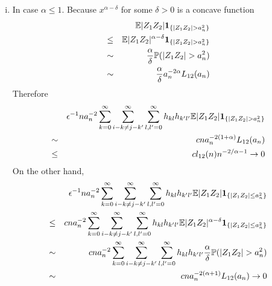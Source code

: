 \documentclass{article}
\begin{document}
\begin{enumerate}[i)]
\item In case $\alpha \leq 1$. 
  Because $x^{\alpha - \delta}$ for some $\delta > 0$ is a concave function
  \begin{eqnarray*}
    && \mathbb{E} |Z_1 Z_2| \mathbf{1}_{\{ |Z_1 Z_2| > a_n^2\}} \\
    &\leq& \mathbb{E} |Z_1 Z_2|^{\alpha-\delta} \mathbf{1}_{\{|Z_1 Z_2| > a_n^2\}} \\
    &\sim& {\alpha \over \delta} \mathbb{P}(|Z_1 Z_2| > a_n^2) \\
    &\sim& {\alpha \over \delta} a_n^{-2\alpha} L_{12}(a_n)
  \end{eqnarray*}
  Therefore
  \begin{eqnarray*}
    && \epsilon^{-1} n a_n^{-2} \sum_{k=0}^\infty \sum_{i-k \neq j-k'}^\infty
    \sum_{l,l'=0}^\infty h_{kl} h_{k'l'} \mathbb{E} |Z_1 Z_2| \mathbf{1}_{\{|Z_1 Z_2| >
      a_n^2\}} \\
    &\sim& c n a_n^{-2(1 + \alpha)} L_{12}(a_n) \\
    &\leq& c l_{12}(n) n^{-2/\alpha-1} \to 0
  \end{eqnarray*}
  On the other hand, 
  \begin{eqnarray*}
    && \epsilon^{-1} n a_n^{-2} \sum_{k=0}^\infty \sum_{i-k \neq j-k'}^\infty
    \sum_{l,l'=0}^\infty h_{kl} h_{k'l'}
    \mathbb{E} |Z_1 Z_2| \mathbf{1}_{\{|Z_1 Z_2| \leq a_n^2\}} \\
    &\leq& c n a_n^{-2} \sum_{k=0}^\infty \sum_{i-k \neq j-k'}^\infty
    \sum_{l,l'=0}^\infty h_{kl} h_{k'l'} \mathbb{E} |Z_1 Z_2|^{\alpha -
      \delta}
    \mathbf{1}_{\{|Z_1 Z_2| \leq a_n^2\}} \\
    &\sim& c n a_n^{-2} \sum_{k=0}^\infty \sum_{i-k \neq j-k'}^\infty
    \sum_{l,l'=0}^\infty h_{kl} h_{k'l'} {\alpha \over \delta}
    \mathbb{P}(|Z_1 Z_2| > a_n^2)\\
    &\sim& c n a_n^{-2(\alpha + 1)}L_{12}(a_n) \to 0
  \end{eqnarray*}


\end{enumerate}
\end{document}
